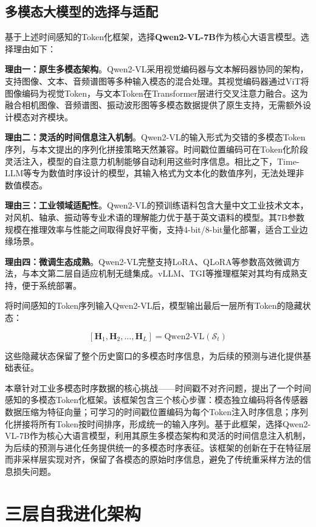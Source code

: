 \documentclass[12pt,a4paper]{article}
\begin{document}
\subsection{多模态大模型的选择与适配}

基于上述时间感知的Token化框架，选择\textbf{Qwen2-VL-7B}作为核心大语言模型。选择理由如下：

\textbf{理由一：原生多模态架构}。Qwen2-VL采用视觉编码器与文本解码器协同的架构，支持图像、文本、音频谱图等多种输入模态的混合处理。其视觉编码器通过ViT将图像编码为视觉Token，与文本Token在Transformer层进行交叉注意力融合。这为融合相机图像、音频谱图、振动波形图等多模态数据提供了原生支持，无需额外设计模态对齐模块。

\textbf{理由二：灵活的时间信息注入机制}。Qwen2-VL的输入形式为交错的多模态Token序列，与本文提出的序列化拼接策略天然兼容。时间戳位置编码可在Token化阶段灵活注入，模型的自注意力机制能够自动利用这些时序信息。相比之下，Time-LLM等专为数值时序设计的模型\cite{jin2024time}，其输入格式为文本化的数值序列，无法处理非数值模态。

\textbf{理由三：工业领域适配性}。Qwen2-VL的预训练语料包含大量中文工业技术文本，对风机、轴承、振动等专业术语的理解能力优于基于英文语料的模型。其7B参数规模在推理效率与性能之间取得良好平衡，支持4-bit/8-bit量化部署，适合工业边缘场景。

\textbf{理由四：微调生态成熟}。Qwen2-VL完整支持LoRA、QLoRA等参数高效微调方法\cite{hu2022lora}，与本文第二层自适应机制无缝集成。vLLM、TGI等推理框架对其均有成熟支持，便于系统部署。

将时间感知的Token序列输入Qwen2-VL后，模型输出最后一层所有Token的隐藏状态：

\[
[\mathbf{H}_1, \mathbf{H}_2, \ldots, \mathbf{H}_L] = \text{Qwen2-VL}(\mathcal{S}_t)
\]

这些隐藏状态保留了整个历史窗口的多模态时序信息，为后续的预测与进化提供基础表征。

本章针对工业多模态时序数据的核心挑战——时间戳不对齐问题，提出了一个时间感知的多模态Token化框架。该框架包含三个核心步骤：模态独立编码将各传感器数据压缩为特征向量；可学习的时间戳位置编码为每个Token注入时序信息；序列化拼接将所有Token按时间排序，形成统一的输入序列。基于此框架，选择Qwen2-VL-7B作为核心大语言模型，利用其原生多模态架构和灵活的时间信息注入机制，为后续的预测与进化任务提供统一的多模态时序表征。该框架的创新在于在特征层而非采样层实现对齐，保留了各模态的原始时序信息，避免了传统重采样方法的信息损失问题。

\section{三层自我进化架构}
\end{document}
